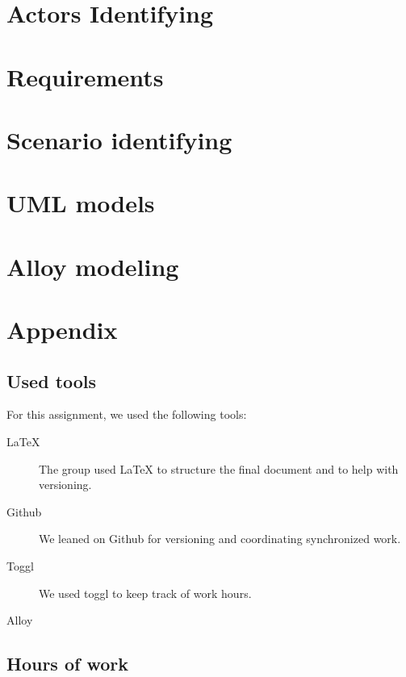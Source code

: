 \documentclass{article}
\begin{document}
	\newpage
	\section{Actors Identifying}

	\newpage
	\section{Requirements}

	\newpage
	\section{Scenario identifying}

	\newpage
	\section{UML models}

	\newpage
	\section{Alloy modeling}

	\newpage
	\section{Appendix}
		\listoffigures
		\listoftables
		
		\subsection{Used tools}
		For this assignment, we used the following tools:
		
		\begin{description}
			\item [LaTeX] The group used LaTeX to structure the final document and to help with versioning.
			\item [Github] We leaned on Github for versioning and coordinating synchronized work.
			\item [Toggl] We used toggl to keep track of work hours.
			\item [Alloy]
		\end{description}
		
		\subsection{Hours of work}
\end{document}
